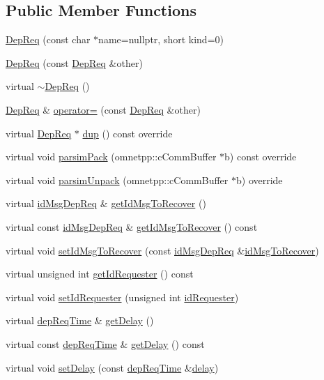\subsection*{Public Member Functions}
\begin{DoxyCompactItemize}
\item 
\hyperlink{classDepReq_a133b51d43699e8ebecccf069935d93c4}{Dep\+Req} (const char $\ast$name=nullptr, short kind=0)
\item 
\hyperlink{classDepReq_adf6800c87693c1de5b88d89c577186b8}{Dep\+Req} (const \hyperlink{classDepReq}{Dep\+Req} \&other)
\item 
virtual \hyperlink{classDepReq_a6f770d0327bf43dcef5f6a58f5a32183}{$\sim$\+Dep\+Req} ()
\item 
\hyperlink{classDepReq}{Dep\+Req} \& \hyperlink{classDepReq_a343eae743e4ca183897f0af8410d5ba3}{operator=} (const \hyperlink{classDepReq}{Dep\+Req} \&other)
\item 
virtual \hyperlink{classDepReq}{Dep\+Req} $\ast$ \hyperlink{classDepReq_a430632dbd4f70a3a1183f226f0484bf3}{dup} () const override
\item 
virtual void \hyperlink{classDepReq_a94c2def7b925be45621e20fd31e28e77}{parsim\+Pack} (omnetpp\+::c\+Comm\+Buffer $\ast$b) const override
\item 
virtual void \hyperlink{classDepReq_a4fa8adb572938bc44f0a04463ea2df8d}{parsim\+Unpack} (omnetpp\+::c\+Comm\+Buffer $\ast$b) override
\item 
virtual \hyperlink{depReq__m_8h_a2bbb71ed0e9660ec02d81471eafd9c29}{id\+Msg\+Dep\+Req} \& \hyperlink{classDepReq_abbf56cc3e6a0be7ff696f9216f51f968}{get\+Id\+Msg\+To\+Recover} ()
\item 
virtual const \hyperlink{depReq__m_8h_a2bbb71ed0e9660ec02d81471eafd9c29}{id\+Msg\+Dep\+Req} \& \hyperlink{classDepReq_ab173923214b88b6c4b2f1d1cee8313d0}{get\+Id\+Msg\+To\+Recover} () const
\item 
virtual void \hyperlink{classDepReq_a488a57f56c5fc87aae853a2b3e469fd0}{set\+Id\+Msg\+To\+Recover} (const \hyperlink{depReq__m_8h_a2bbb71ed0e9660ec02d81471eafd9c29}{id\+Msg\+Dep\+Req} \&\hyperlink{classDepReq_a8547e169d4670212c0b612924dda94cc}{id\+Msg\+To\+Recover})
\item 
virtual unsigned int \hyperlink{classDepReq_a68f528e65d1529da94226f8a83483d6c}{get\+Id\+Requester} () const
\item 
virtual void \hyperlink{classDepReq_a27f6e58ad8dcf4902de1042322a3e6e7}{set\+Id\+Requester} (unsigned int \hyperlink{classDepReq_a26936e95ef3fae4753d2442318646c6b}{id\+Requester})
\item 
virtual \hyperlink{depReq__m_8h_ae16a4057335e3a89fda3f6019868733b}{dep\+Req\+Time} \& \hyperlink{classDepReq_a42fa35b3ced2cd9a4afd0ddeade48c19}{get\+Delay} ()
\item 
virtual const \hyperlink{depReq__m_8h_ae16a4057335e3a89fda3f6019868733b}{dep\+Req\+Time} \& \hyperlink{classDepReq_a3f686e18997f1383d0670a271d45a37b}{get\+Delay} () const
\item 
virtual void \hyperlink{classDepReq_a90ae52243ec735ebf15bdf3e8467b393}{set\+Delay} (const \hyperlink{depReq__m_8h_ae16a4057335e3a89fda3f6019868733b}{dep\+Req\+Time} \&\hyperlink{classDepReq_a5df5ddeac692e25c089b458faf51e0c9}{delay})
\end{DoxyCompactItemize}

